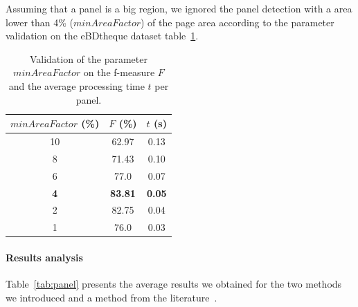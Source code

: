 Assuming that a panel is a big region, we ignored the panel detection with a area lower than 4\% ($minAreaFactor$) of the page area according to the parameter validation on the eBDtheque dataset table~\ref{tab:minAreaFactor_validation}.


  \begin{table}[ht]
    \centering
    \caption{Validation of the parameter $minAreaFactor$ on the f-measure $F$ and the average processing time $t$ per panel.}
    \begin{tabular}{|c|c|c|}
		\hline
		$minAreaFactor$ (\%) & $F$ (\%) 	&$t$ (s)\\
		\hline 
		10 & 62.97 & 0.13 \\
		\hline
		8 & 71.43 & 0.10 \\
		\hline
		6 & 77.0 & 0.07	\\
		\hline
		\textbf{4} & \textbf{83.81} & \textbf{0.05} \\
		\hline
		2 & 82.75 & 0.04 \\
		\hline
		1 & 76.0 & 0.03 \\
		\hline

	\end{tabular}
    \label{tab:minAreaFactor_validation}
  \end{table}%



\paragraph{Results analysis} %
\label{par:results_analysis}

Table~\ref{tab:panel} presents the average results we obtained for the two methods we introduced and a method from the literature~\cite{Arai11}.

